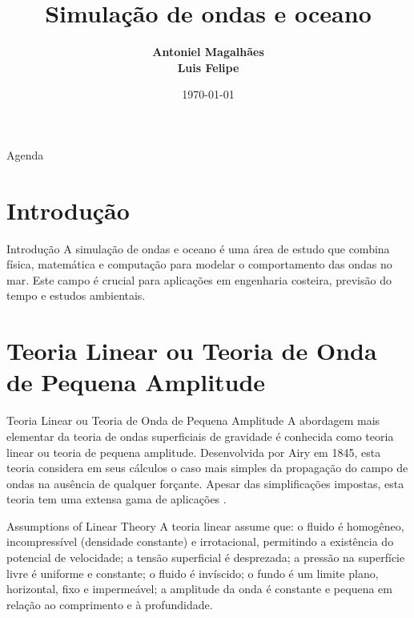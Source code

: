 \documentclass[aspectratio=169,xcolor=table]{beamer}
\author[Magalhães, Felipe]{%
  \textbf{Antoniel Magalhães} \\
  \textbf{Luis Felipe}
}
\title{Simulação de ondas e oceano}
\institute{Universidade Federal da Bahia \\ Instituto de Computação}
\date{\today}
\begin{document}
\begin{frame}
    \titlepage
\end{frame}

\begin{frame}{Agenda}
    \tableofcontents
\end{frame}

\section{Introdução}
\begin{frame}{Introdução}
    A simulação de ondas e oceano é uma área de estudo que combina física, matemática e computação para modelar o comportamento das ondas no mar. Este campo é crucial para aplicações em engenharia costeira, previsão do tempo e estudos ambientais.
\end{frame}

\section{Teoria Linear ou Teoria de Onda de Pequena Amplitude}
\begin{frame}{Teoria Linear ou Teoria de Onda de Pequena Amplitude}
    A abordagem mais elementar da teoria de ondas superficiais de gravidade é conhecida como teoria linear ou teoria de pequena amplitude. Desenvolvida por Airy em 1845, esta teoria considera em seus cálculos o caso mais simples da propagação do campo de ondas na ausência de qualquer forçante. Apesar das simplificações impostas, esta teoria tem uma extensa gama de aplicações \cite{meirelles2007modelagem}.
\end{frame}

\begin{frame}{Assumptions of Linear Theory}
    A teoria linear assume que: o fluido é homogêneo, incompressível (densidade constante) e irrotacional, permitindo a existência do potencial de velocidade; a tensão superficial é desprezada; a pressão na superfície livre é uniforme e constante; o fluido é invíscido; o fundo é um limite plano, horizontal, fixo e impermeável; a amplitude da onda é constante e pequena em relação ao comprimento e à profundidade.
\end{frame}
\end{document}
